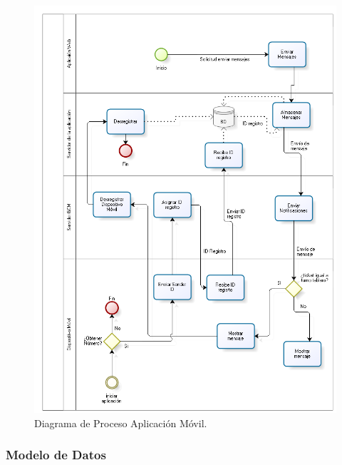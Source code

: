 \begin{figure}[H]
\centering
\includegraphics[scale=0.70]{images/capitulo4/diagramaProceso.png}
\caption{Diagrama de Proceso Aplicación Móvil.}
\label{diagramaProceso}
\end{figure}


\subsubsection{Modelo de Datos}

